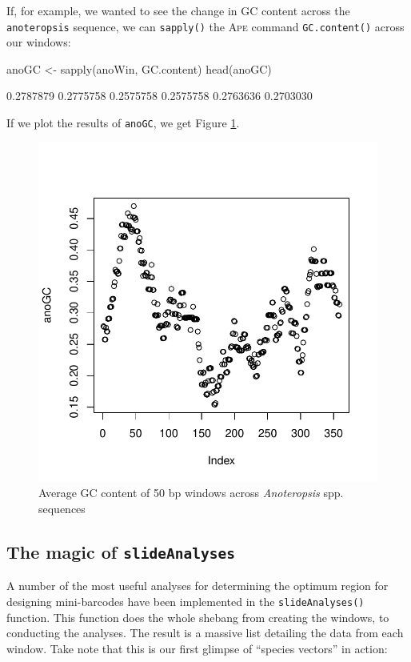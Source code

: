 \documentclass{article}
\newcommand{\progname}[1]{\textsc{#1}}
\newcommand{\fun}[1]{\texttt{#1}}
\begin{document}
If, for example, we wanted to see the change in GC content across the \fun{anoteropsis} sequence, we can \fun{sapply()} the \progname{Ape} command \fun{GC.content()} across our windows:

\begin{console}
anoGC <- sapply(anoWin, GC.content)
head(anoGC)
\end{console}
\begin{Routput}
[1] 0.2787879 0.2775758 0.2575758 0.2575758 0.2763636 0.2703030
\end{Routput}

If we plot the results of \fun{anoGC}, we get Figure \ref{slidWin.fig}.

\begin{figure}[tbp]
	\includegraphics{slidWin}
	\caption{Average GC content of 50 bp windows across \emph{Anoteropsis} spp. sequences}
	\label{slidWin.fig}
\end{figure}

\subsection{The magic of \fun{slideAnalyses}}
A number of the most useful analyses for determining the optimum region for designing mini-barcodes \citep{Meus.etal.2008} have been implemented in the \fun{slideAnalyses()} function. This function does the whole shebang from creating the windows, to conducting the analyses. The result is a massive list detailing the data from each window. Take note that this is our first glimpse of ``species vectors'' in action:
\end{document}
